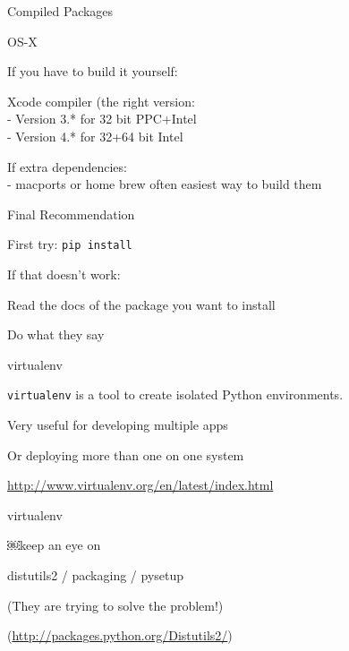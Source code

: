 \documentclass{beamer}
\begin{document}
\begin{frame}[fragile]{Compiled Packages}

{\LARGE OS-X}

\vfill
{\Large If you have to build it yourself:}

\vfill
{\Large Xcode compiler (the right version:\\[0.1in]
  - Version 3.* for 32 bit PPC+Intel\\[0.1in]
  - Version 4.* for 32+64 bit Intel\\
}

\vfill
{\Large If extra dependencies:\\[0.1in]
  - macports or home brew often easiest way to build them
}

\end{frame} 

\begin{frame}[fragile]{Final Recommendation}

{\Large First try: \verb|pip install|}

\vfill
{\Large If that doesn't work:}

\vfill
{\Large Read the docs of the package you want to install}

\vfill
{\Large Do what they say}

\end{frame} 

\begin{frame}[fragile]{virtualenv}

{\Large \verb|virtualenv| is a tool to create isolated Python environments.}

\vfill
{\Large Very useful for developing multiple apps}

\vfill
{\Large Or deploying more than one on one system}

\vfill
\url{http://www.virtualenv.org/en/latest/index.html}
\end{frame} 

\begin{frame}[fragile]{virtualenv}

{\Large ￼keep an eye on}

\vfill
{\Large distutils2 / packaging / pysetup }

\vfill
{\large (They are trying to solve the problem!) }

\vfill
(\url{http://packages.python.org/Distutils2/})
\end{frame} 
\end{document}
